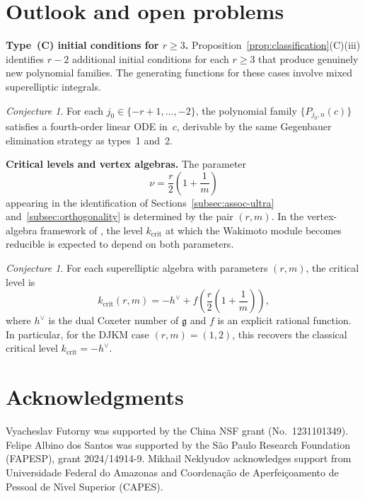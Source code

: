 \documentclass[final,nopreprintline]{elsarticle}
\theoremstyle{definition}
\numberwithin{equation}{section}
\theoremstyle{remark}
\newtheorem{conjecture}[theorem]{Conjecture}
\begin{document}
\section{Outlook and open problems}\label{sec:outlook}

\noindent\textbf{Type~(C) initial conditions for $r\ge3$.}
Proposition~\ref{prop:classification}(C)(iii) identifies $r-2$ additional initial
conditions for each $r\ge3$ that produce genuinely new polynomial families. The
generating functions for these cases involve mixed superelliptic integrals.

\begin{conjecture}\label{conj:typeC}
For each $j_0\in\{-r+1,\ldots,-2\}$, the polynomial family $\{P_{j_0,n}(c)\}$
satisfies a fourth-order linear ODE in~$c$, derivable by the same Gegenbauer
elimination strategy as types~1 and~2.
\end{conjecture}

\noindent\textbf{Critical levels and vertex algebras.}
The parameter
\[
\nu = \frac{r}{2}\!\left(1+\frac{1}{m}\right)
\]
appearing in the identification of Sections~\ref{subsec:assoc-ultra}
and~\ref{subsec:orthogonality} is determined by the pair $(r,m)$. In the vertex-algebra
framework of \cite{Cox2014}, the level $k_{\mathrm{crit}}$ at which the Wakimoto module
becomes reducible is expected to depend on both parameters.

\begin{conjecture}\label{conj:kcrit}
For each superelliptic algebra with parameters $(r,m)$, the critical level is
\[
k_{\mathrm{crit}}(r,m) = -h^{\vee} + f\!\left(\frac{r}{2}\!\left(1+\frac{1}{m}\right)\right),
\]
where $h^\vee$ is the dual Coxeter number of $\mathfrak{g}$ and $f$ is an explicit rational
function. In particular, for the DJKM case $(r,m)=(1,2)$, this recovers the classical
critical level $k_{\mathrm{crit}}=-h^{\vee}$.
\end{conjecture}

\section*{Acknowledgments}

Vyacheslav Futorny was supported by the China NSF grant (No.~1231101349).
Felipe Albino dos Santos was supported by the S\~{a}o Paulo Research Foundation
(FAPESP), grant 2024/14914-9.
Mikhail Neklyudov acknowledges support from Universidade Federal do Amazonas and
Coordena\c{c}\~{a}o de Aperfei\c{c}oamento de Pessoal de N\'{\i}vel Superior (CAPES).
\end{document}
